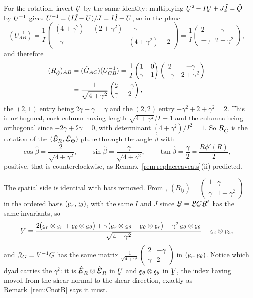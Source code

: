 For the rotation, invert $\bU$ by the same identity: multiplying
$\bU^{2}-I\bU+J\hI=\hOb$ by $\bU^{-1}$ gives $\bU^{-1}=(I\hI-\bU)/J
=I\hI-\bU$, so in the plane
\[
   (U^{-1}_{AB})=\frac{1}{I}
   \begin{pmatrix}(4+\gamma^{2})-(2+\gamma^{2})&-\gamma\\
   -\gamma&(4+\gamma^{2})-2\end{pmatrix}
   =\frac{1}{I}\begin{pmatrix}2&-\gamma\\ -\gamma&2+\gamma^{2}
   \end{pmatrix},
\]
and therefore
\[
\begin{aligned}
   (R_{\hat\bG})_{AB}&=(\hat G_{AC})(U^{-1}_{CB})
   =\frac{1}{I}\begin{pmatrix}1&0\\ \gamma&1\end{pmatrix}
    \begin{pmatrix}2&-\gamma\\ -\gamma&2+\gamma^{2}\end{pmatrix}\\
   &=\frac{1}{\sqrt{4+\gamma^{2}}}
    \begin{pmatrix}2&-\gamma\\ \gamma&2\end{pmatrix},
\end{aligned}
\]
the $(2,1)$ entry being $2\gamma-\gamma=\gamma$ and the $(2,2)$ entry
$-\gamma^{2}+2+\gamma^{2}=2$. This is orthogonal, each column having
length $\sqrt{4+\gamma^{2}}/I=1$ and the columns being orthogonal since
$-2\gamma+2\gamma=0$, with determinant $(4+\gamma^{2})/I^{2}=1$. So
$\bR_{\hat\bG}$ is the rotation of the $(\hER,\hETh)$ plane through the
angle $\hat\beta$ with
\[
   \cos\hat\beta=\frac{2}{\sqrt{4+\gamma^{2}}},\qquad
   \sin\hat\beta=\frac{\gamma}{\sqrt{4+\gamma^{2}}},\qquad
   \tan\hat\beta=\frac{\gamma}{2}=\frac{R\phi'(R)}{2},
\]
positive, that is counterclockwise, as
Remark~\ref{rem:replacecaveats}(ii) predicted.

The spatial side is identical with hats removed. From ,
$(B_{ij})=\left(\begin{smallmatrix}1&\gamma\\ \gamma&1+\gamma^{2}
\end{smallmatrix}\right)$ in the ordered basis $(\ber,\bet)$, with the
same $I$ and $J$ since $\bB=\bR\bC\bR^{t}$ has the same invariants, so
\[
   \bV=\frac{2\big(\ber\otimes\ber+\bet\otimes\bet\big)
     +\gamma\big(\ber\otimes\bet+\bet\otimes\ber\big)
     +\gamma^{2}\,\bet\otimes\bet}{\sqrt{4+\gamma^{2}}}
     +\be_{3}\otimes\be_{3},
\]
and $\bR_{\bG}=\bV^{-1}\bG$ has the same matrix
$\tfrac{1}{\sqrt{4+\gamma^{2}}}\left(\begin{smallmatrix}2&-\gamma\\
\gamma&2\end{smallmatrix}\right)$ in $(\ber,\bet)$. Notice which dyad
carries the $\gamma^{2}$: it is $\hER\otimes\hER$ in $\bU$ and
$\bet\otimes\bet$ in $\bV$, the index having moved from the shear normal
to the shear direction, exactly as Remark~\ref{rem:CnotB} says it must.

